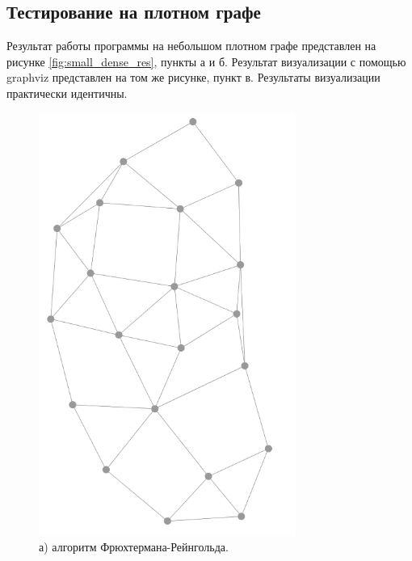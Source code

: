 \documentclass[14pt, russian]{scrartcl}
\begin{document}
\subsection{Тестирование на плотном графе}


Результат работы программы на небольшом плотном графе представлен на рисунке \ref{fig:small_dense_res}, пункты а и б. Результат визуализации с помощью graphviz представлен на том же рисунке, пункт в. Результаты визуализации практически идентичны. 

\begin{figure}[H]
\centering
  \begin{minipage}[t]{.45\textwidth}
  \centering
\includegraphics[width=0.75\textwidth]{./imgs/fg_small_dense.png}
  \caption*{а) алгоритм Фрюхтермана-Рейнгольда.}
  \end{minipage}
  \noindent
  \begin{minipage}[t]{.50\textwidth}
  \centering

\end{minipage}
\end{figure}
\end{document}
